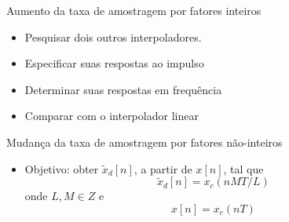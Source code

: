 \begin{slide}{Aumento da taxa de amostragem por fatores inteiros}
	\begin{itemize}
		\item Pesquisar dois outros interpoladores.
		\item Especificar suas respostas ao impulso
		\item Determinar suas respostas em frequência
		\item Comparar com o interpolador linear
	\end{itemize}
\end{slide}

\begin{slide}{Mudança da taxa de amostragem por fatores não-inteiros}
	\begin{itemize}
		\item Objetivo: obter $\tilde x_d[n]$, a partir de $x[n]$, tal que 
			\begin{equation*}
				\tilde x_d[n] = x_c(nMT/L)
			\end{equation*}
			onde $L, M \in Z$ e 
			\begin{equation*}
				x[n] = x_c(nT)
			\end{equation*}
			\begin{figure}
				\centering
		        \end{figure}
	\end{itemize}
\end{slide}

